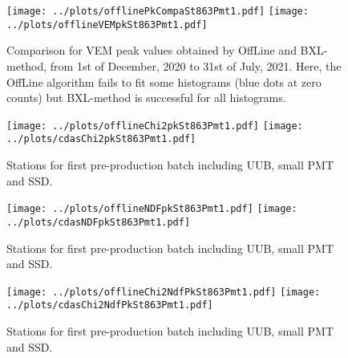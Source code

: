 \documentclass[twoside, final, 10pt]{articleMine}
\begin{document}

\begin{figure}[!tbh]
  \centering
  \subfigure
  {
    \texttt{[image: ../plots/offlinePkCompaSt863Pmt1.pdf]}
    \texttt{[image: ../plots/offlineVEMpkSt863Pmt1.pdf]}
  }
  \caption{Comparison for VEM peak values obtained by OffLine and
  BXL-method, from 1st of December, 2020 to 31st of July, 2021.
  Here, the OffLine algorithm fails to fit some histograms (blue
  dots at zero counts) but BXL-method is successful for all
  histograms.}
  \label{figPkCompVemOffBxl}
\end{figure}
\clearpage

\begin{figure}[!tbh]
  \centering
  \subfigure
  {
    \texttt{[image: ../plots/offlineChi2pkSt863Pmt1.pdf]}
    \texttt{[image: ../plots/cdasChi2pkSt863Pmt1.pdf]}
  }
  \caption{Stations for first pre-production batch including UUB, small PMT and SSD.}
  \label{figPkNdfserie}
\end{figure}

\begin{figure}[!tbh]
  \centering
  \subfigure
  {
    \texttt{[image: ../plots/offlineNDFpkSt863Pmt1.pdf]}
    \texttt{[image: ../plots/cdasNDFpkSt863Pmt1.pdf]}
  }
  \caption{Stations for first pre-production batch including UUB, small PMT and SSD.}
  \label{figPkNdfserie}
\end{figure}


\begin{figure}[!tbh]
  \centering
  \subfigure
  {
    \texttt{[image: ../plots/offlineChi2NdfPkSt863Pmt1.pdf]}
    \texttt{[image: ../plots/cdasChi2NdfPkSt863Pmt1.pdf]}
  }
  \caption{Stations for first pre-production batch including UUB, small PMT and SSD.}
  \label{figPkChi2Ndfserie}
\end{figure}
\clearpage
\end{document}
